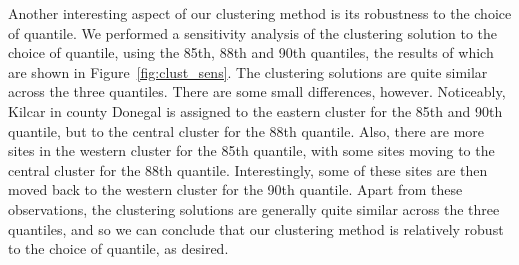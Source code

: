 \documentclass[12pt]{article}
\begin{document}
Another interesting aspect of our clustering method is its robustness to the choice of quantile.
We performed a sensitivity analysis of the clustering solution to the choice of quantile, using the 85th, 88th and 90th quantiles, the results of which are shown in Figure~\ref{fig:clust_sens}.
The clustering solutions are quite similar across the three quantiles.
There are some small differences, however. 
Noticeably, Kilcar in county Donegal is assigned to the eastern cluster for the 85th and 90th quantile, but to the central cluster for the 88th quantile.
Also, there are more sites in the western cluster for the 85th quantile, with some sites moving to the central cluster for the 88th quantile. 
Interestingly, some of these sites are then moved back to the western cluster for the 90th quantile.
Apart from these observations, the clustering solutions are generally quite similar across the three quantiles, and so we can conclude that our clustering method is relatively robust to the choice of quantile, as desired. 
\end{document}
